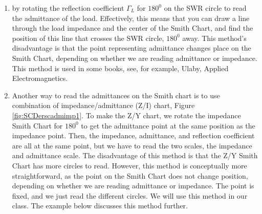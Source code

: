 \documentclass{ximera}
\begin{document}
\begin{enumerate}
\item  by rotating the reflection coefficient $\Gamma_L$ for $180^0$ on the SWR circle to read the admittance of the load. Effectively, this means that you can draw a line through the load impedance and the center of the Smith Chart, and find the position of this line that crosses the SWR circle, $180^0$ away. This method's disadvantage is that the point representing admittance changes place on the Smith Chart, depending on whether we are reading admittance or impedance. This method is used in some books, see, for example, Ulaby, Applied Electromagnetics.

\item Another way to read the admittances on the Smith chart is to use combination of impedance/admittance (Z/I) chart, Figure \ref{fig:SCDerscadmimp1}. To make the Z/Y chart, we rotate the impedance Smith Chart for $180^0$ to get the admittance point at the same position as the impedance point. Then, the impedance, admittance, and reflection coefficient are all at the same point, but we have to read the two scales, the impedance and admittance scale. The disadvantage of this method is that the Z/Y Smith Chart has more circles to read. However, this method is conceptually more straightforward, as the point on the Smith Chart does not change position, depending on whether we are reading admittance or impedance. The point is fixed, and we just read the different circles. We will use this method in our class. The example below discusses this method further.



\end{enumerate}
\end{document}
